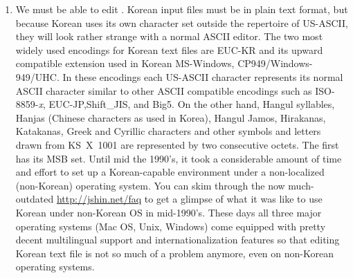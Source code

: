 \begin{enumerate}
\item 
We must be able to 
edit .
Korean input files must be in plain text format, but because Korean
uses its own character set outside the
repertoire of US-ASCII, they will look rather strange with a normal ASCII editor.  The two most widely used encodings for
Korean text files are  EUC-KR and its upward compatible
extension used in Korean MS-Windows, CP949/Windows-949/UHC.
In these encodings each US-ASCII character represents its normal ASCII
character similar to other ASCII compatible encodings such as
ISO-8859-\textit{x}, EUC-JP,Shift\_JIS, and Big5. On the other hand, Hangul
syllables, Hanjas (Chinese characters as used in Korea), Hangul Jamos,
Hirakanas, Katakanas, Greek and Cyrillic characters and other
symbols and letters drawn from KS~X~1001 are represented by two
consecutive octets. The first has its MSB set.
Until mid the 1990's, it took a considerable amount of time and effort to
set up a Korean-capable environment under a non-localized (non-Korean)
operating system. 
You can skim through the now much-outdated \url{http://jshin.net/faq} to get 
a glimpse of what it was like to use Korean under non-Korean OS in mid-1990's.
These days all three major operating systems (Mac OS, Unix, Windows) come equipped
with pretty decent multilingual support and internationalization features
so that editing Korean text file is not so much of a problem anymore, even
on non-Korean operating systems.


\end{enumerate}
